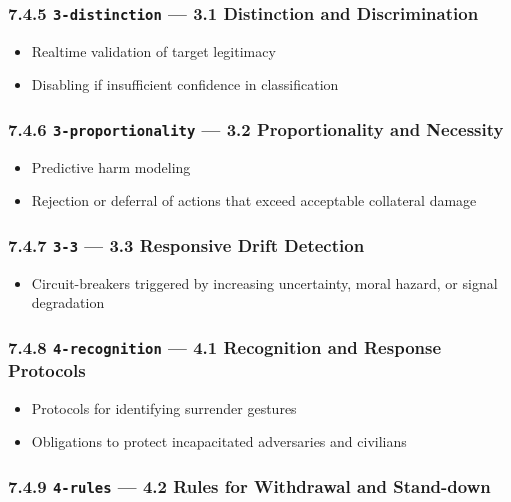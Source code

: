 \documentclass[11pt]{article}
\begin{document}
\subsubsection*{7.4.5 \texttt{3-distinction} — 3.1 Distinction and Discrimination}


\begin{itemize}\setlength\itemsep{0pt}
\item Realtime validation of target legitimacy
\item Disabling if insufficient confidence in classification
\end{itemize}


\subsubsection*{7.4.6 \texttt{3-proportionality} — 3.2 Proportionality and Necessity}


\begin{itemize}\setlength\itemsep{0pt}
\item Predictive harm modeling
\item Rejection or deferral of actions that exceed acceptable collateral damage
\end{itemize}


\subsubsection*{7.4.7 \texttt{3-3} — 3.3 Responsive Drift Detection}


\begin{itemize}\setlength\itemsep{0pt}
\item Circuit-breakers triggered by increasing uncertainty, moral hazard, or signal degradation
\end{itemize}


\subsubsection*{7.4.8 \texttt{4-recognition} — 4.1 Recognition and Response Protocols}


\begin{itemize}\setlength\itemsep{0pt}
\item Protocols for identifying surrender gestures
\item Obligations to protect incapacitated adversaries and civilians
\end{itemize}


\subsubsection*{7.4.9 \texttt{4-rules} — 4.2 Rules for Withdrawal and Stand-down}
\end{document}
